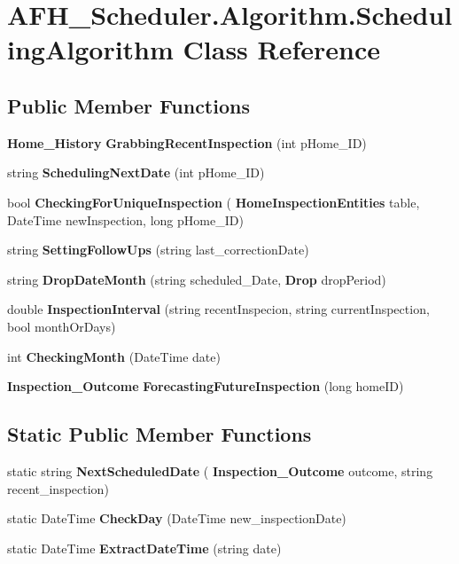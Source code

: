 \section{A\+F\+H\+\_\+\+Scheduler.\+Algorithm.\+Scheduling\+Algorithm Class Reference}
\label{class_a_f_h___scheduler_1_1_algorithm_1_1_scheduling_algorithm}
\subsection*{Public Member Functions}
\begin{DoxyCompactItemize}
\item 
\textbf{ Home\+\_\+\+History} \textbf{ Grabbing\+Recent\+Inspection} (int p\+Home\+\_\+\+ID)
\item 
string \textbf{ Scheduling\+Next\+Date} (int p\+Home\+\_\+\+ID)
\item 
bool \textbf{ Checking\+For\+Unique\+Inspection} (\textbf{ Home\+Inspection\+Entities} table, Date\+Time new\+Inspection, long p\+Home\+\_\+\+ID)
\item 
string \textbf{ Setting\+Follow\+Ups} (string last\+\_\+correction\+Date)
\item 
string \textbf{ Drop\+Date\+Month} (string scheduled\+\_\+\+Date, \textbf{ Drop} drop\+Period)
\item 
double \textbf{ Inspection\+Interval} (string recent\+Inspecion, string current\+Inspection, bool month\+Or\+Days)
\item 
int \textbf{ Checking\+Month} (Date\+Time date)
\item 
\textbf{ Inspection\+\_\+\+Outcome} \textbf{ Forecasting\+Future\+Inspection} (long home\+ID)
\end{DoxyCompactItemize}
\subsection*{Static Public Member Functions}
\begin{DoxyCompactItemize}
\item 
static string \textbf{ Next\+Scheduled\+Date} (\textbf{ Inspection\+\_\+\+Outcome} outcome, string recent\+\_\+inspection)
\item 
static Date\+Time \textbf{ Check\+Day} (Date\+Time new\+\_\+inspection\+Date)
\item 
static Date\+Time \textbf{ Extract\+Date\+Time} (string date)
\end{DoxyCompactItemize}


